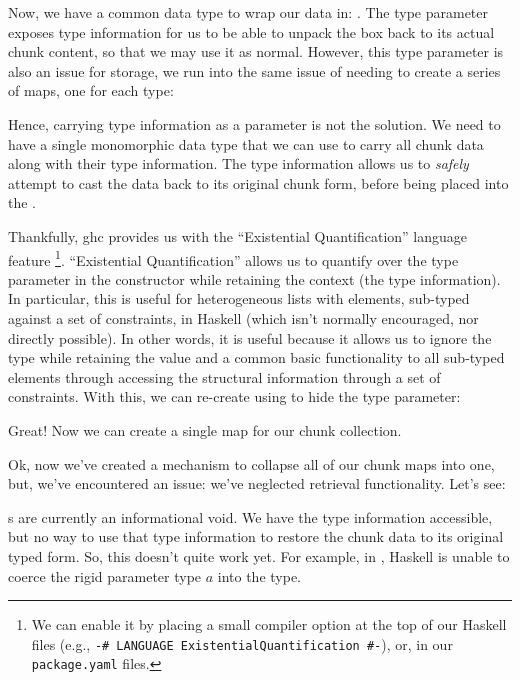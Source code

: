 \badUniversalChunkCarriage{}

Now, we have a common data type to wrap our data in: \Chunk{}. The type
parameter exposes type information for us to be able to unpack the \Chunk{} box
back to its actual chunk content, so that we may use it as normal. However, this
type parameter is also an issue for storage, we run into the same issue of
needing to create a series of maps, one for each type:

\showingBadChunkWouldFailChunkDB{}

Hence, carrying type information as a parameter is not the solution. We need to
have a single monomorphic data type that we can use to carry all chunk data
along with their type information. The type information allows us to
\textit{safely} attempt to cast the data back to its original chunk form, before
being placed into the \ChunkDB{}.

Thankfully, \acs{ghc} provides us with the ``Existential Quantification''
language feature \cite{GHC2020ExistentialQuantification}\footnote{We can enable
it by placing a small compiler option at the top of our Haskell files (e.g.,
\texttt{{-# LANGUAGE ExistentialQuantification #-}}), or, in our
\texttt{package.yaml} files.}. ``Existential Quantification'' allows us to
quantify over the type parameter in the \Chunk{} constructor while retaining the
context (the type information). In  particular, this is useful for heterogeneous
lists with elements, sub-typed against a set of constraints, in Haskell (which
isn't normally encouraged, nor directly possible). In other words, it is useful
because it allows us to ignore the type while retaining the value and a common
basic functionality to all sub-typed elements through accessing the structural
information through a set of constraints. With this, we can re-create \Chunk{}
using \ExistentialQuantification{} to hide the type parameter:

\voidDataChunks{}

Great! Now we can create a single map for our chunk collection.

\voidDataChunkDB{}

Ok, now we've created a mechanism to collapse all of our chunk maps into one,
but, we've encountered an issue: we've neglected retrieval functionality. Let's
see:

\brokenChunkRetriever{}

\Chunk{}s are currently an informational void. We have the type information
accessible, but no way to use that type information to restore the chunk data to
its original typed form. So, this doesn't quite work yet. For example, in
, Haskell is unable to coerce the rigid parameter type
\(a\) into the \QuantityDict{} type.


